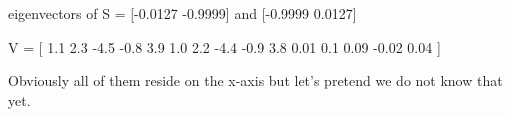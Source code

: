 eigenvectors of S = [-0.0127
  -0.9999]
and
[-0.9999
  0.0127]

V = [
  1.1  2.3 -4.5 -0.8   3.9
  1.0  2.2 -4.4 -0.9   3.8
  0.01 0.1 0.09 -0.02  0.04
]



Obviously all of them reside on the x-axis but let's pretend we do
not know that yet.




